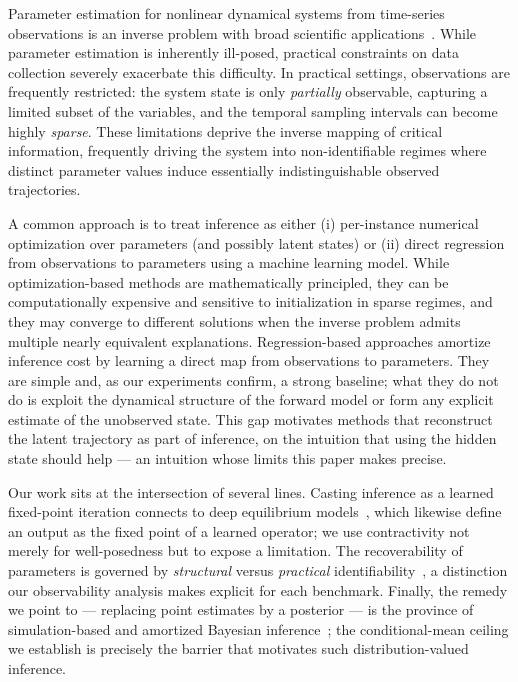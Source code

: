Parameter estimation for nonlinear dynamical systems from time-series observations is an inverse problem with broad scientific applications~\cite{tarantola2005inverse}. 
While parameter estimation is inherently ill-posed, practical constraints on data collection severely exacerbate this difficulty.
In practical settings, observations are frequently restricted:
the system state is only \emph{partially} observable, capturing a limited subset of the variables, and the temporal sampling intervals can become highly \emph{sparse}.
These limitations deprive the inverse mapping of critical information, frequently driving the system into non-identifiable regimes where distinct parameter values induce essentially indistinguishable observed trajectories.

A common approach is to treat inference as either (i) per-instance numerical optimization over parameters (and possibly latent states) or (ii) direct regression from observations to parameters using a machine learning model. 
While optimization-based methods are mathematically principled, they can be computationally expensive and sensitive to initialization in sparse regimes, and they may converge to different solutions when the inverse problem admits multiple nearly equivalent explanations. 
Regression-based approaches amortize inference cost by learning a direct map from observations to parameters. They are simple and, as our experiments confirm, a strong baseline; what they do not do is exploit the dynamical structure of the forward model or form any explicit estimate of the unobserved state. This gap motivates methods that reconstruct the latent trajectory as part of inference, on the intuition that using the hidden state should help --- an intuition whose limits this paper makes precise.

Our work sits at the intersection of several lines. Casting inference as a learned fixed-point iteration connects to deep equilibrium models~\cite{bai2019deep}, which likewise define an output as the fixed point of a learned operator; we use contractivity not merely for well-posedness but to expose a limitation. The recoverability of parameters is governed by \emph{structural} versus \emph{practical} identifiability~\cite{villaverde2016structural}, a distinction our observability analysis makes explicit for each benchmark. Finally, the remedy we point to --- replacing point estimates by a posterior --- is the province of simulation-based and amortized Bayesian inference~\cite{cranmer2020frontier,papamakarios2016fast}; the conditional-mean ceiling we establish is precisely the barrier that motivates such distribution-valued inference.

